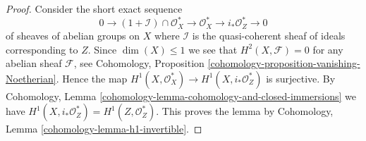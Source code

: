 \documentclass[10pt,a4paper]{amsart}
\theoremstyle{plain}
\theoremstyle{definition}
\theoremstyle{remark}
\numberwithin{equation}{subsection}
\begin{document}
\begin{proof}
Consider the short exact sequence
$$
0 \to (1 + \mathcal{I}) \cap \mathcal{O}_X^* \to
\mathcal{O}^*_X \to i_*\mathcal{O}^*_Z \to 0
$$
of sheaves of abelian groups on $X$ where $\mathcal{I}$
is the quasi-coherent sheaf of ideals corresponding to $Z$.
Since $\dim(X) \leq 1$ we see that $H^2(X, \mathcal{F}) = 0$
for any abelian sheaf $\mathcal{F}$, see
Cohomology, Proposition \ref{cohomology-proposition-vanishing-Noetherian}.
Hence the map $H^1(X, \mathcal{O}^*_X) \to H^1(X, i_*\mathcal{O}_Z^*)$
is surjective. By
Cohomology, Lemma \ref{cohomology-lemma-cohomology-and-closed-immersions}
we have $H^1(X, i_*\mathcal{O}_Z^*) = H^1(Z, \mathcal{O}_Z^*)$.
This proves the lemma by
Cohomology, Lemma \ref{cohomology-lemma-h1-invertible}.
\end{proof}
\end{document}
